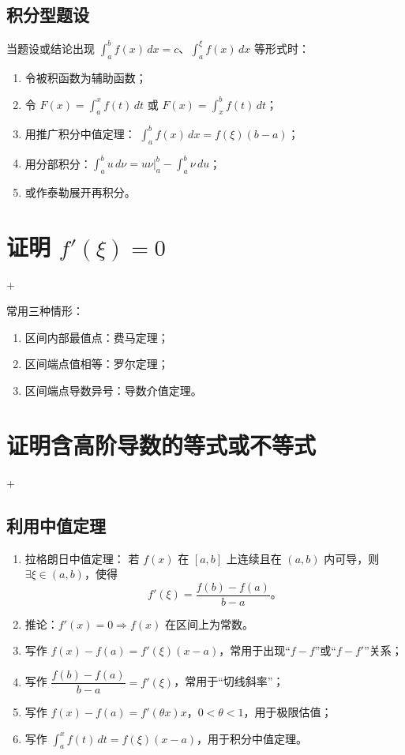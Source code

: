 \subsection{积分型题设}
当题设或结论出现 $\displaystyle \int_a^b f(x)\,dx = c$、$\int_a^\xi f(x)\,dx$ 等形式时：
\begin{enumerate}
    \item 令被积函数为辅助函数；
    \item 令 $F(x)=\int_a^x f(t)\,dt$ 或 $F(x)=\int_x^b f(t)\,dt$；
    \item 用推广积分中值定理：
          $\displaystyle \int_a^b f(x)\,dx=f(\xi)(b-a)$；
    \item 用分部积分：$\displaystyle \int_a^b u\,d\nu=u\nu\Big|_a^b-\int_a^b\nu\,du$；
    \item 或作泰勒展开再积分。
\end{enumerate}


\section{证明 $f'(\xi)=0$}
\DTwoTwo+\DTwoThree

常用三种情形：
\begin{enumerate}
    \item 区间内部最值点：费马定理；
    \item 区间端点值相等：罗尔定理；
    \item 区间端点导数异号：导数介值定理。
\end{enumerate}


\section{证明含高阶导数的等式或不等式}
\DTwoTwo+\DTwoThree

\subsection{利用中值定理}
\begin{enumerate}
    \item 拉格朗日中值定理：
          若 $f(x)$ 在 $[a,b]$ 上连续且在 $(a,b)$ 内可导，则
          $\exists \xi \in (a,b)$，使得
          \[
              f'(\xi)=\frac{f(b)-f(a)}{b-a}。
          \]
    \item 推论：$f'(x)=0\Rightarrow f(x)$ 在区间上为常数。
    \item 写作 $f(x)-f(a)=f'(\xi)(x-a)$，常用于出现“$f-f$”或“$f-f'$”关系；
    \item 写作 $\dfrac{f(b)-f(a)}{b-a}=f'(\xi)$，常用于“切线斜率”；
    \item 写作 $f(x)-f(a)=f'(\theta x)x$，$0<\theta<1$，用于极限估值；
    \item 写作 $\int_a^x f(t)\,dt=f(\xi)(x-a)$，用于积分中值定理。
\end{enumerate}


